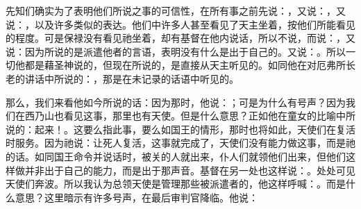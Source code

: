 \par

\par

先知们确实为了表明他们所说之事的可信性，在所有事之前先说：，又说：，又说：，以及许多类似的表达。他们中许多人甚至看见了天主坐着，按他们所能看见的程度。可是保禄没有看见祂坐着，却有基督在他内说话，所以不说，而说：，又说：因为所说的是派遣他者的言语，表明没有什么是出于自己的。又说：。所以一切他都是藉圣神说的，但现在所说的，是直接从天主听见的。如同他在对厄弗所长老的讲话中所说的：，那是在未记录的话语中听见的。\par

那么，我们来看他如今所说的话：因为那时，他说：；可是为什么有号声？因为我们在西乃山也看见这事，那里也有天使。但是什么意思？正如他在童女的比喻中所说的：起来！。这要么指此事，要么如国王的情形，那时也将如此，天使们在复活时服务。因为祂说：让死人复活，这事就完成了，天使们没有能力做这事，而是祂的话。如同国王命令并说话时，被关的人就出来，仆人们就领他们出来，但他们这样做并非出于自己的能力，而是出于那声音。基督在另一处也这样说：。处处可见天使们奔波。所以我认为总领天使是管理那些被派遣者的，他这样呼喊：。而是什么意思？这里暗示有许多号声，在最后审判官降临。他说：\par

\par


